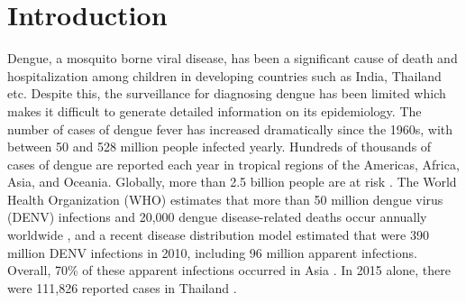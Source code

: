 \documentclass[review]{elsarticle}
\begin{document}
\linenumbers

\section{Introduction}

Dengue, a mosquito borne viral disease, has been a significant cause of death and hospitalization among children in developing countries such as India, Thailand etc. Despite this, the surveillance for diagnosing dengue has been limited which makes it difficult to generate detailed information on its epidemiology. The number of cases of dengue fever has increased dramatically since the 1960s, with between 50 and 528 million people infected yearly. Hundreds of thousands of cases of dengue are reported each year in tropical regions of the Americas, Africa, Asia, and Oceania. Globally, more than 2.5 billion people are at risk \cite{whodengue2012}. The World Health Organization (WHO) estimates that more than 50 million dengue virus (DENV) infections and 20,000 dengue disease-related deaths occur annually worldwide \cite{world2007scientific,whodengue2012fact}, and a recent disease distribution model estimated that were 390 million DENV infections in 2010, including 96 million apparent infections. Overall, 70\% of these apparent infections occurred in Asia \cite{bhatt2013global}. In 2015 alone, there were 111,826 reported cases in Thailand \cite{denguethai2015}. 


\end{document}
